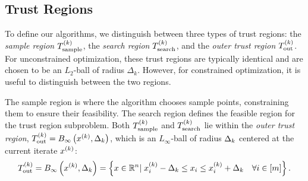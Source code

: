 \documentclass{article}
\begin{document}
%
%



\subsection{Trust Regions}

\label{trust_regions_section}

To define our algorithms, we distinguish between three types of trust regions: 
the {\em sample region} ${T_{\text{sample}}^{(k)}}$,
the {\em search region} ${T_{\text{search}}^{(k)}}$,
and the {\em outer trust region} ${T_{\text{out}}^{(k)}}$.
For unconstrained optimization,  these trust regions are typically identical and are chosen to be an $L_2$-ball of radius $\Delta_k$.
However, for constrained optimization, it is useful to distinguish between the two regions.



The sample region is where the algorithm chooses sample points, constraining them to ensure their feasibility.
The search region defines the feasible region for the trust region subproblem.
Both ${T_{\text{sample}}^{(k)}}$ and ${T_{\text{search}}^{(k)}}$ lie within the {\em outer trust region},
${T_{\text{out}}^{(k)}} = B_{\infty}\left(x^{(k)}, \Delta_k\right)$, which is an $L_{\infty}$-ball of radius $\Delta_k$ centered at the current iterate $x^{(k)}$:
\begin{align}
\label{define_outer_trust_region}
{T_{\text{out}}^{(k)}} = B_{\infty}\left(x^{(k)},\Delta_k\right) = \left\{x\in \mathbb R^n | \; x_i^{(k)} - \Delta_k \le x_i \le x_i^{(k)} + \Delta_k \quad \forall i \in [m] \right \}.
\end{align}
\end{document}
